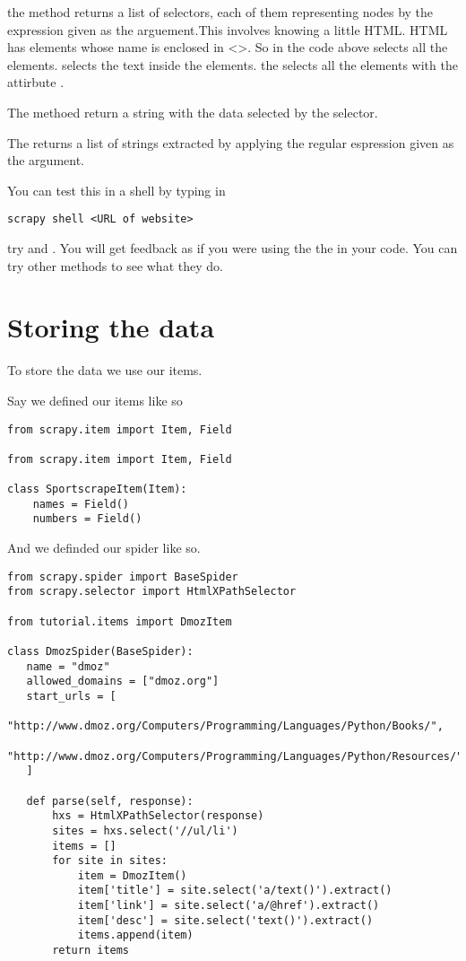 the  method returns a list of selectors, each of them representing nodes by the expression given as the arguement.This involves knowing a little HTML. HTML has elements whose name is enclosed in <>. So in the code above  selects  all the  elements.  selects the text inside the  elements. the  selects all the  elements with the attirbute .  

The  methoed return a string with the data selected by the selector.

The  returns a list of strings extracted by applying the regular espression given as the argument.

You can test this in a shell by typing in
\begin{lstlisting}
scrapy shell <URL of website>
\end{lstlisting}

try  and . You will get feedback as if you were using the the  in your code. You can try other methods to see what they do.

\section*{Storing the data}
To store the data we use our items. 

Say we defined our items like so
\begin{lstlisting}
from scrapy.item import Item, Field

from scrapy.item import Item, Field

class SportscrapeItem(Item):
    names = Field()
    numbers = Field()
\end{lstlisting}

And we definded our spider like so.
\begin{lstlisting}
from scrapy.spider import BaseSpider
from scrapy.selector import HtmlXPathSelector

from tutorial.items import DmozItem

class DmozSpider(BaseSpider):
   name = "dmoz"
   allowed_domains = ["dmoz.org"]
   start_urls = [
       "http://www.dmoz.org/Computers/Programming/Languages/Python/Books/",
       "http://www.dmoz.org/Computers/Programming/Languages/Python/Resources/"
   ]

   def parse(self, response):
       hxs = HtmlXPathSelector(response)
       sites = hxs.select('//ul/li')
       items = []
       for site in sites:
           item = DmozItem()
           item['title'] = site.select('a/text()').extract()
           item['link'] = site.select('a/@href').extract()
           item['desc'] = site.select('text()').extract()
           items.append(item)
       return items
\end{lstlisting}

